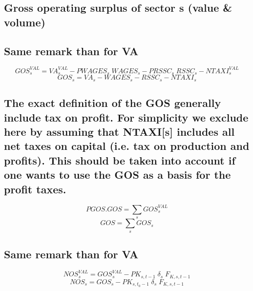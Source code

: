 \documentclass[12pt]{article}
\numberwithin{equation}{section}
\begin{document}
\subsection{Gross operating surplus of sector s (value \& volume)}




\subsection{Same remark than for VA}



\begin{dmath}
GOS^{VAL}_{s} = VA^{VAL}_{s} - PWAGES_{s} \; WAGES_{s} - PRSSC_{s} \; RSSC_{s} - NTAXI^{VAL}_{s}
\end{dmath}
\begin{dmath}
GOS_{s} = VA_{s} - WAGES_{s} - RSSC_{s} - NTAXI_{s}
\end{dmath}



\subsection{The exact definition of the GOS generally include tax on profit. For simplicity we exclude here by assuming that NTAXI[s] includes all net taxes on capital (i.e. tax on production and profits). This should be taken into account if one wants to use the GOS as a basis for the profit taxes.}





\begin{dmath}
PGOS . GOS = \sum_{s} GOS^{VAL}_{s}
\end{dmath}
\begin{dmath}
GOS = \sum_{s} GOS_{s}
\end{dmath}




\subsection{Same remark than for VA}



\begin{dmath}
NOS^{VAL}_{s} = GOS^{VAL}_{s} - PK_{s, t-1} \; \delta_{s} \; F_{K, s, t-1}
\end{dmath}
\begin{dmath}
NOS_{s} = GOS_{s} - PK_{s, t_{0}-1} \; \delta_{s} \; F_{K, s, t-1}
\end{dmath}
\end{document}
